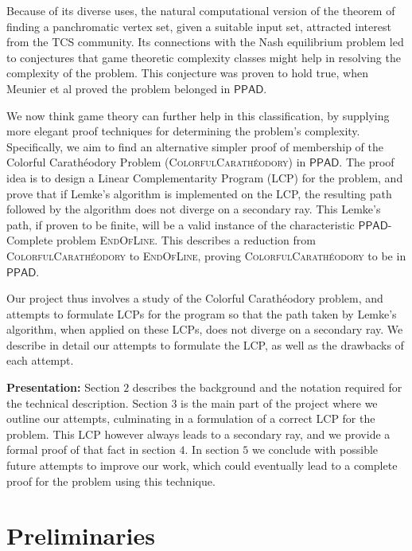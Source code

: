 \documentclass[a4paper,11pt]{article}
\def\cc#1{\mathsf{#1}}
\def\PPAD{\ensuremath{\cc{PPAD}}\xspace}
\def\problem#1{\textsc{#1}}
\def\EOL{\problem{EndOfLine}\xspace}
\def\CC{Colorful Carath\'eodory }
\def\CCP{\problem{ColorfulCarath\'eodory}\xspace}
\begin{document}
\par Because of its diverse uses, the natural computational version of the theorem of finding a panchromatic vertex set, given a suitable input set, attracted interest from the TCS community. Its connections with the Nash equilibrium problem led to conjectures that game theoretic complexity classes might help in resolving the complexity of the problem. This conjecture was proven to hold true, when Meunier et al proved the problem belonged in \PPAD \cite{CCP_PPAD}. 

\par We now think game theory can further help in this classification, by supplying more elegant proof techniques for determining the problem's complexity. Specifically, we aim to find an alternative simpler proof of membership of the \CC Problem (\CCP) in \PPAD. The proof idea is to design a Linear Complementarity Program (LCP) for the problem, and prove that if Lemke's algorithm is implemented on the LCP, the resulting path followed by the algorithm does not diverge on a secondary ray. This Lemke's path, if proven to be finite, will be a valid instance of the characteristic \PPAD-Complete problem \EOL. This describes a reduction from \CCP to \EOL, proving \CCP to be in \PPAD.

\par Our project thus involves a study of the \CC problem, and attempts to formulate LCPs for the program so that the path taken by Lemke's algorithm, when applied on these LCPs, does not diverge on a secondary ray. We describe in detail our attempts to formulate the LCP, as well as the drawbacks of each attempt. 

\textbf{Presentation:} Section $2$ describes the background and the notation required for the technical description. Section $3$ is the main part of the project where we outline our attempts, culminating in a formulation of a correct LCP for the problem. This LCP however always leads to a secondary ray, and we provide a formal proof of that fact in section $4$. In section $5$ we conclude with possible future attempts to improve our work, which could eventually lead to a complete proof for the problem using this technique.   

\section{Preliminaries}
\end{document}
